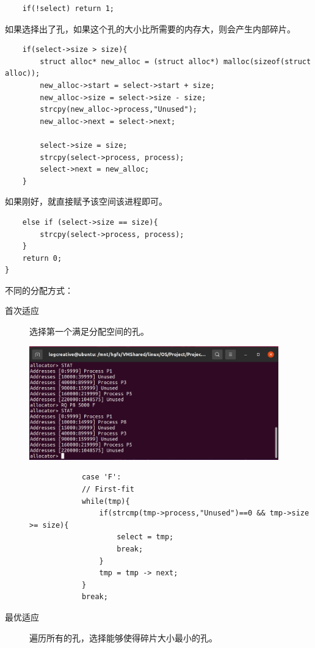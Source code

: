 \documentclass[12pt,a4paper]{article}
\newenvironment{problems}{\begin{list}{}{\renewcommand{\makelabel}[1]{\textbf{##1}\hfil}}}{\end{list}}
\begin{document}
\begin{problems}
    \begin{lstlisting}
    if(!select) return 1;
    \end{lstlisting}
    如果选择出了孔，如果这个孔的大小比所需要的内存大，则会产生内部碎片。
    
    

    \begin{lstlisting}
    if(select->size > size){
        struct alloc* new_alloc = (struct alloc*) malloc(sizeof(struct alloc));
        new_alloc->start = select->start + size;
        new_alloc->size = select->size - size;
        strcpy(new_alloc->process,"Unused");
        new_alloc->next = select->next;
        
        select->size = size;
        strcpy(select->process, process);
        select->next = new_alloc;
    } 
    \end{lstlisting}
    如果刚好，就直接赋予该空间该进程即可。
    \begin{lstlisting}
    else if (select->size == size){
        strcpy(select->process, process);
    }
    return 0;
}
    \end{lstlisting}
    
    不同的分配方式：
    \begin{description}
        \item[首次适应] 选择第一个满足分配空间的孔。
        
        \includegraphics[width=0.88\textwidth]{RQF.png}
        
        \begin{lstlisting}
            case 'F':
            // First-fit
            while(tmp){
                if(strcmp(tmp->process,"Unused")==0 && tmp->size >= size){
                    select = tmp;
                    break;
                }
                tmp = tmp -> next;
            }
            break;
        \end{lstlisting} 
        \item[最优适应] 遍历所有的孔，选择能够使得碎片大小最小的孔。
        

\end{description}
\end{problems}
\end{document}
